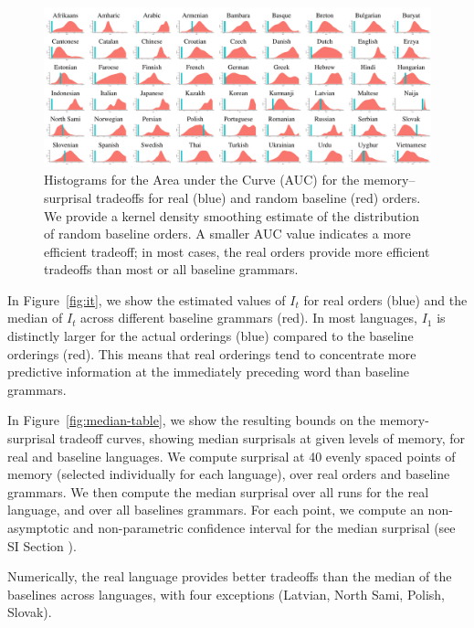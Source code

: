 \begin{figure}
	\begin{center}
\includegraphics[width=\textwidth]{auc-table.pdf}
\end{center}
\caption{Histograms for the Area under the Curve (AUC) for the memory--surprisal tradeoffs for real (blue) and random baseline (red) orders.
We provide a kernel density smoothing estimate of the distribution of random baseline orders.
A smaller AUC value indicates a more efficient tradeoff; in most cases, the real orders provide more efficient tradeoffs than most or all baseline grammars.
}\label{fig:auc}
\end{figure}






In Figure~\ref{fig:it}, we show the estimated values of $I_t$ for real orders (blue) and the median of $I_t$ across different baseline grammars (red).
In most languages, $I_1$ is distinctly larger for the actual orderings (blue) compared to the baseline orderings (red). This means that real orderings tend to concentrate more predictive information at the immediately preceding word than baseline grammars.

In Figure~\ref{fig:median-table}, we show the resulting bounds on the memory-surprisal tradeoff curves, showing median surprisals at given levels of memory, for real and baseline languages.
We compute surprisal at 40 evenly spaced points of memory (selected individually for each language), over real orders and baseline grammars.
We then compute the median surprisal over all runs for the real language, and over all baselines grammars.
For each point, we compute an non-asymptotic and non-parametric confidence interval for the median surprisal (see SI Section \REF).

Numerically, the real language provides better tradeoffs than the median of the baselines across languages, with four exceptions (Latvian, North Sami, Polish, Slovak).


